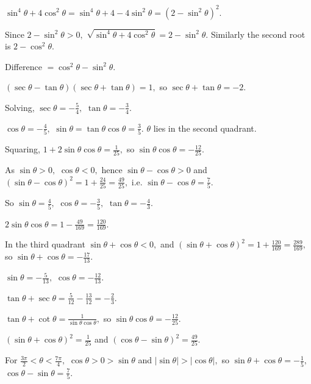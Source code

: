 \item $\sin^4\theta + 4\cos^2\theta = \sin^4\theta + 4 - 4\sin^2\theta = (2 - \sin^2\theta)^2.$

  Since $2 - \sin^2\theta > 0,$ $\sqrt{\sin^4\theta + 4\cos^2\theta} = 2 - \sin^2\theta.$ Similarly the second root is $2 -
  \cos^2\theta.$

  Difference $= \cos^2\theta - \sin^2\theta.$

\item $(\sec\theta - \tan\theta)(\sec\theta + \tan\theta) = 1,$ so $\sec\theta + \tan\theta = -2.$

  Solving, $\sec\theta = -\frac{5}{4},$ $\tan\theta = -\frac{3}{4}.$

  $\cos\theta = -\frac{4}{5},$ $\sin\theta = \tan\theta\cos\theta = \frac{3}{5}.$ $\theta$ lies in the second quadrant.

\item Squaring, $1 + 2\sin\theta\cos\theta = \frac{1}{25},$ so $\sin\theta\cos\theta = -\frac{12}{25}.$

  As $\sin\theta > 0,$ $\cos\theta < 0,$ hence $\sin\theta - \cos\theta > 0$ and $(\sin\theta - \cos\theta)^2 = 1 + \frac{24}{25}
  = \frac{49}{25},$ i.e. $\sin\theta - \cos\theta = \frac{7}{5}.$

  So $\sin\theta = \frac{4}{5},$ $\cos\theta = -\frac{3}{5},$ $\tan\theta = -\frac{4}{3}.$

\item $2\sin\theta\cos\theta = 1 - \frac{49}{169} = \frac{120}{169}.$

  In the third quadrant $\sin\theta + \cos\theta < 0,$ and $(\sin\theta + \cos\theta)^2 = 1 + \frac{120}{169} =
  \frac{289}{169},$ so $\sin\theta + \cos\theta = -\frac{17}{13}.$

  $\sin\theta = -\frac{5}{13},$ $\cos\theta = -\frac{12}{13}.$

  $\tan\theta + \sec\theta = \frac{5}{12} - \frac{13}{12} = -\frac{2}{3}.$

\item $\tan\theta + \cot\theta = \frac{1}{\sin\theta\cos\theta},$ so $\sin\theta\cos\theta = -\frac{12}{25}.$

  $(\sin\theta + \cos\theta)^2 = \frac{1}{25}$ and $(\cos\theta - \sin\theta)^2 = \frac{49}{25}.$

  For $\frac{3\pi}{2} < \theta < \frac{7\pi}{4},$ $\cos\theta > 0 > \sin\theta$ and $|\sin\theta| > |\cos\theta|,$ so
  $\sin\theta + \cos\theta = -\frac{1}{5},$ $\cos\theta - \sin\theta = \frac{7}{5}.$

